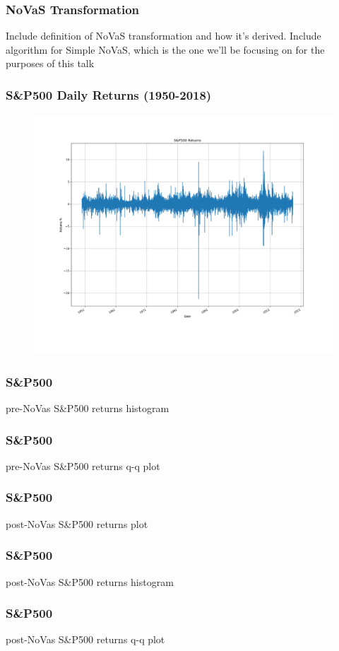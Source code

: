 \documentclass{beamer}
\begin{document}
\begin{frame}
\frametitle{NoVaS Transformation}
Include definition of NoVaS transformation and how it's derived.
Include algorithm for Simple NoVaS, which is the one we'll be focusing on for the purposes of this talk
\end{frame}


\begin{frame}
\frametitle{S&P500 Daily Returns (1950-2018)}
\begin{figure}[h!]
\centering 
\includegraphics[height=\textheight, width=\textwidth]{sp500_returns.png}
\end{figure}
\end{frame}

\begin{frame}
\frametitle{S&P500}
pre-NoVas S&P500 returns histogram
\end{frame}

\begin{frame}
\frametitle{S&P500}
pre-NoVas S&P500 returns q-q plot
\end{frame}

\begin{frame}
\frametitle{S&P500}
post-NoVas S&P500 returns plot
\end{frame}

\begin{frame}
\frametitle{S&P500}
post-NoVas S&P500 returns histogram
\end{frame}

\begin{frame}
\frametitle{S&P500}
post-NoVas S&P500 returns q-q plot
\end{frame}
\end{document}
